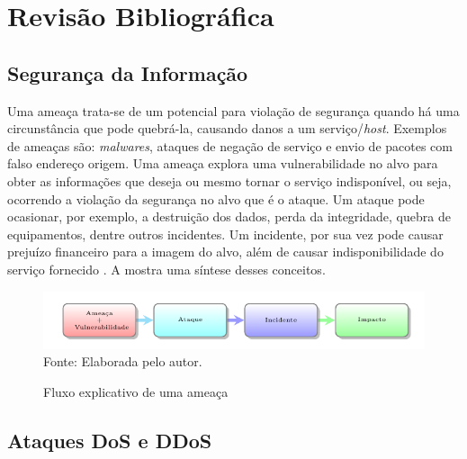 \chapter[Revisão Bibliográfica]{Revisão Bibliográfica}
\section{Segurança da Informação}
Uma ameaça trata-se de um potencial para violação de segurança quando há uma circunstância que pode quebrá-la, causando danos a um serviço/\textit{host}. Exemplos de ameaças são: \textit{malwares}, ataques de negação de serviço e envio de pacotes com falso endereço origem. Uma ameaça explora uma vulnerabilidade no alvo para obter as informações que deseja ou mesmo tornar o serviço indisponível, ou seja, ocorrendo a violação da segurança no alvo que é o ataque. Um ataque pode ocasionar, por exemplo, a destruição dos dados, perda da integridade, quebra de equipamentos, dentre outros incidentes. Um incidente, por sua vez pode causar prejuízo financeiro para a imagem do alvo, além de causar indisponibilidade do serviço fornecido \cite{kurose}. A  mostra uma síntese desses conceitos.   

 \begin{figure}[ht]
 	\centering
 	\caption{Fluxo explicativo de uma ameaça }
 	\includegraphics[width=1\textwidth]{figs/ameacas.pdf}\\
 	{Fonte: Elaborada pelo autor.}
 	\label{fig:ameacas}
 \end{figure}
 
 \section{Ataques DoS e DDoS}


